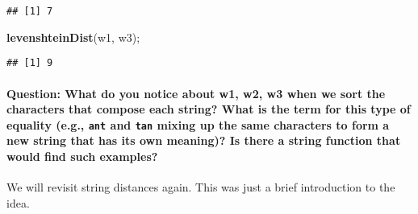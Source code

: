 \documentclass[
]{article}
\newenvironment{Shaded}{\begin{snugshade}}{\end{snugshade}}
\newcommand{\KeywordTok}[1]{\textcolor[rgb]{0.13,0.29,0.53}{\textbf{#1}}}
\newcommand{\NormalTok}[1]{#1}
\begin{document}
\begin{verbatim}
## [1] 7
\end{verbatim}

\begin{Shaded}
\begin{Highlighting}[]
\KeywordTok{levenshteinDist}\NormalTok{(w1, w3);}
\end{Highlighting}
\end{Shaded}

\begin{verbatim}
## [1] 9
\end{verbatim}

\hypertarget{question-what-do-you-notice-about-w1-w2-w3-when-we-sort-the-characters-that-compose-each-string-what-is-the-term-for-this-type-of-equality-e.g.-ant-and-tan-mixing-up-the-same-characters-to-form-a-new-string-that-has-its-own-meaning-is-there-a-string-function-that-would-find-such-examples}{%
\paragraph{\texorpdfstring{Question: What do you notice about w1, w2, w3
when we sort the characters that compose each string? What is the term
for this type of equality (e.g., \texttt{ant} and \texttt{tan} mixing up
the same characters to form a new string that has its own meaning)? Is
there a string function that would find such
examples?}{Question: What do you notice about w1, w2, w3 when we sort the characters that compose each string? What is the term for this type of equality (e.g., ant and tan mixing up the same characters to form a new string that has its own meaning)? Is there a string function that would find such examples?}}\label{question-what-do-you-notice-about-w1-w2-w3-when-we-sort-the-characters-that-compose-each-string-what-is-the-term-for-this-type-of-equality-e.g.-ant-and-tan-mixing-up-the-same-characters-to-form-a-new-string-that-has-its-own-meaning-is-there-a-string-function-that-would-find-such-examples}}

We will revisit string distances again. This was just a brief
introduction to the idea.
\end{document}
